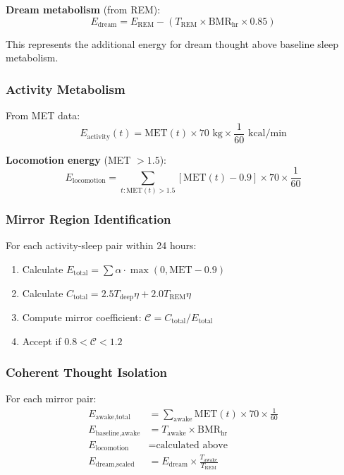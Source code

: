 \documentclass[12pt,twocolumn]{article}
\theoremstyle{remark}
\begin{document}
\textbf{Dream metabolism} (from REM):
\begin{equation}
E_{\text{dream}} = E_{\text{REM}} - (T_{\text{REM}} \times \text{BMR}_{\text{hr}} \times 0.85)
\end{equation}

This represents the additional energy for dream thought above baseline sleep metabolism.

\subsubsection{Activity Metabolism}

From MET data:
\begin{equation}
E_{\text{activity}}(t) = \text{MET}(t) \times 70 \text{ kg} \times \frac{1}{60} \text{ kcal/min}
\end{equation}

\textbf{Locomotion energy} (MET $> 1.5$):
\begin{equation}
E_{\text{locomotion}} = \sum_{t: \text{MET}(t) > 1.5} [\text{MET}(t) - 0.9] \times 70 \times \frac{1}{60}
\end{equation}

\subsubsection{Mirror Region Identification}

For each activity-sleep pair within 24 hours:
\begin{enumerate}
\item Calculate $E_{\text{total}} = \sum \alpha \cdot \max(0, \text{MET} - 0.9)$
\item Calculate $C_{\text{total}} = 2.5 T_{\text{deep}} \eta + 2.0 T_{\text{REM}} \eta$
\item Compute mirror coefficient: $\mathcal{C} = C_{\text{total}} / E_{\text{total}}$
\item Accept if $0.8 < \mathcal{C} < 1.2$
\end{enumerate}

\subsubsection{Coherent Thought Isolation}

For each mirror pair:
\begin{align}
E_{\text{awake,total}} &= \sum_{\text{awake}} \text{MET}(t) \times 70 \times \frac{1}{60} \\
E_{\text{baseline,awake}} &= T_{\text{awake}} \times \text{BMR}_{\text{hr}} \\
E_{\text{locomotion}} &= \text{calculated above} \\
E_{\text{dream,scaled}} &= E_{\text{dream}} \times \frac{T_{\text{awake}}}{T_{\text{REM}}}
\end{align}
\end{document}
